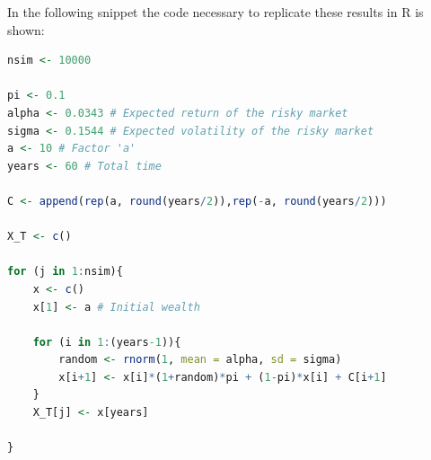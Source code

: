 In the following snippet the code necessary to replicate these results in R is shown:
\begin{lstlisting}[language = R]
nsim <- 10000

pi <- 0.1
alpha <- 0.0343 # Expected return of the risky market
sigma <- 0.1544 # Expected volatility of the risky market
a <- 10 # Factor 'a'
years <- 60 # Total time

C <- append(rep(a, round(years/2)),rep(-a, round(years/2)))

X_T <- c()

for (j in 1:nsim){
	x <- c()
	x[1] <- a # Initial wealth

	for (i in 1:(years-1)){
		random <- rnorm(1, mean = alpha, sd = sigma)
		x[i+1] <- x[i]*(1+random)*pi + (1-pi)*x[i] + C[i+1]
	}
	X_T[j] <- x[years]

}
\end{lstlisting}
